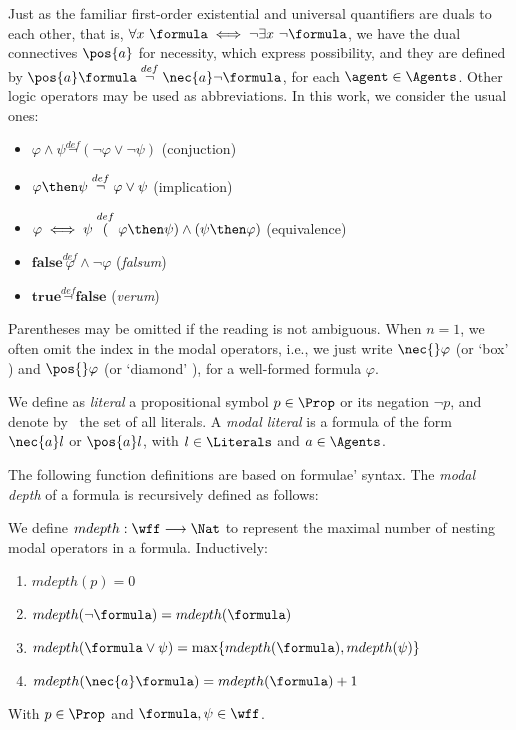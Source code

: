 Just as the familiar first-order existential and universal quantifiers are duals
to each other, that is, $\forall x\ \formula \iff \neg \exists x\ \neg \formula$, we have
the dual connectives $\pos{a}$ for necessity, which express possibility, and
they are defined by $\pos{a} \formula \stackrel{def} \neg \nec{a} \neg \formula$, for each
$\agent \in \Agents$. Other logic operators may be used as abbreviations.
In this work, we consider the usual ones:
\begin{itemize}
    \item $\varphi \wedge \psi \stackrel{def} \neg(\neg \varphi \lor \neg \psi)$ (conjuction)
    \item $\varphi \then \psi \stackrel{def} \neg \varphi \lor \psi$ (implication)
    \item $\varphi \iff \psi \stackrel{def} (\varphi \then \psi) \land (\psi \then \varphi)$ (equivalence)
    \item $\textbf{false} \stackrel{def} \varphi \wedge \neg \varphi$ (\emph{falsum})
    \item $ \textbf{true} \stackrel{def} \neg \textbf{false}$ (\emph{verum}) 
\end{itemize}

Parentheses may be omitted if the reading is not ambiguous.  When $n = 1$, we
often omit the index in the modal operators, i.e., we just write $\nec{}
\varphi$ (or `box' \formula) and $\pos{}\varphi$ (or `diamond' \formula), for a
well-formed formula $\varphi$. 

We define as \emph{literal} a propositional symbol $p \in \Prop$ or its negation $\neg
p$, and denote by \Literals~the set of all literals. A \emph{modal literal} is a
formula of the form $\nec{a} l$ or $\pos{a} l$, with $l \in \Literals$ and $a
\in \Agents$.

The following function definitions are based on formulae' syntax. The
\emph{modal depth} of a formula is recursively defined as follows:

\begin{definition}
    We define $mdepth : \wff \longrightarrow \Nat$ to represent the
    maximal number of nesting modal operators in a formula. Inductively:
    \begin{enumerate}
        \item $mdepth(p) = 0$ 
        \item $mdepth(\neg \formula) = mdepth(\formula)$
        \item $mdepth(\formula \lor \psi) = \max\{mdepth(\formula), mdepth(\psi)\}$
        \item $mdepth(\nec{a} \formula) = mdepth(\formula) + 1$
    \end{enumerate}
    With $p \in \Prop$ and $\formula, \psi \in \wff$.
\end{definition}

